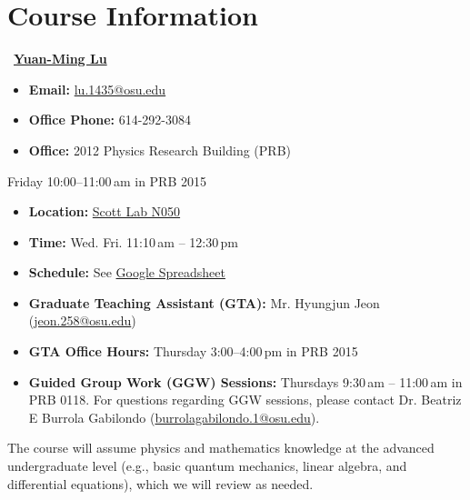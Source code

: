 \chapter{Course Information}

\Jobs~\href{https://physics.osu.edu/people/lu.1435}{\textbf{Yuan-Ming Lu}}

\begin{itemize}
  \item \textbf{Email:} \href{mailto:lu.1435@osu.edu}{lu.1435@osu.edu}
  \item \textbf{Office Phone:} 614-292-3084
  \item \textbf{Office:} 2012 Physics Research Building (PRB)
\end{itemize}

Friday 10:00--11:00\,am in PRB 2015

\begin{itemize}
  \item \textbf{Location:} \href{https://www.osu.edu/map/building/148}{Scott Lab N050}
  \item \textbf{Time:} Wed. Fri. 11:10\,am -- 12:30\,pm
  \item \textbf{Schedule:} See \href{https://docs.google.com/spreadsheets/d/1czMLda2yYjPPWqLrT6RY-lmh-6S2gPE9/edit?usp=sharing&ouid=110786316698514501494&rtpof=true&sd=true}{Google Spreadsheet}
\end{itemize}

\begin{itemize}
  \item \textbf{Graduate Teaching Assistant (GTA):} Mr. Hyungjun Jeon (\href{mailto:jeon.258@osu.edu}{jeon.258@osu.edu})
  \item \textbf{GTA Office Hours:} Thursday 3:00--4:00\,pm in PRB 2015
  \item \textbf{Guided Group Work (GGW) Sessions:} Thursdays 9:30\,am -- 11:00\,am in PRB 0118. For questions regarding GGW sessions, please contact Dr. Beatriz E Burrola Gabilondo (\href{mailto:burrolagabilondo.1@osu.edu}{burrolagabilondo.1@osu.edu}).
\end{itemize}

The course will assume physics and mathematics knowledge at the advanced undergraduate level (e.g., basic quantum mechanics, linear algebra, and differential equations), which we will review as needed.

